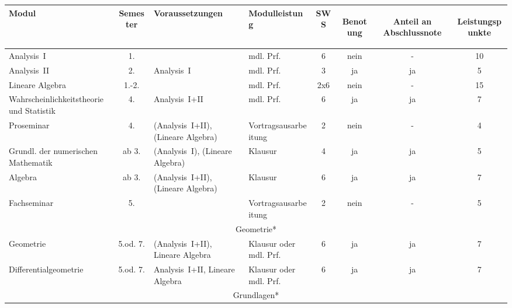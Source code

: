 \begin{table}[tbp]
    \begin{footnotesize}
    \begin{tabularx}{\textwidth}{|@{~}X@{~}|@{~}c@{~}|@{~}X@{~}|@{~}X@{~}|@{~}c@{~}|@{~}c@{~}|@{~}c@{~}|@{~}c@{~}|}
        \hline
        Modul & Semes\-ter & Voraus\-setzungen & Modul\-leistung & SWS & \begin{sideways}Be\-notung\end{sideways} & \begin{sideways}Anteil an Abschluss\-note \end{sideways}& \begin{sideways}Leistungspunkte\end{sideways}\\\hline\hline
        Analysis~I  &   1.  &                &   mdl. Prf.   &  6   &   nein    &   -   &   10\\\hline
        Analysis~II &   2.  &   Analysis~I   &   mdl. Prf.   &  3   &   ja      &   ja  &   5\\\hline
        Lineare Algebra &  1.-2.   &         &   mdl. Prf.   &  2x6 &   nein    &   -   &   15\\\hline
        Wahr\-schein\-lich\-keits\-theorie und Sta\-tis\-tik&4.&Analysis~I+II&mdl. Prf.&6&ja&ja&7\\\hline
        Pro\-seminar&4.&(Analy\-sis~I+II), (Lineare Algebra)&Vortrags\-aus\-arbeitung&2&nein&-&4\\\hline
        Grundl. der numerischen Mathe\-matik&ab 3.&(Analy\-sis~I), (Lineare Algebra)&Klausur&4&ja&ja&5\\\hline
        Algebra&ab 3.&(Analy\-sis~I+II), (Lineare Algebra)&Klausur&6&ja&ja&7\\\hline
        Fach\-seminar&5.&&Vortrags\-aus\-arbeitung&2&nein&-&5\\\hline\hline
        \multicolumn{8}{|c|}{Geometrie*}\\\hline
        Geometrie&5.od. 7.&(Analysis~I+II), Lineare Algebra&Klausur oder mdl. Prf.&6&ja&ja&7\\\hline
        Differential\-geometrie&5.od. 7.&Analysis~I+II, Lineare Algebra&Klausur oder mdl. Prf.&6&ja&ja&7\\\hline\hline
        \multicolumn{8}{|c|}{Grundlagen*}\\\hline

\end{tabularx}
\end{footnotesize}
\end{table}
